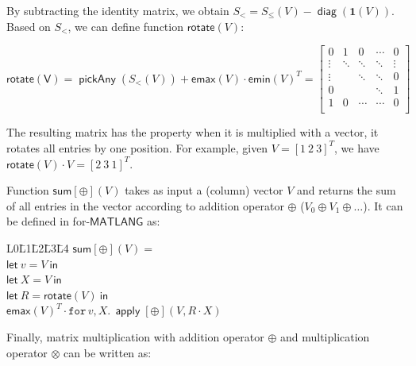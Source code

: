 \documentclass{article}
\DeclareMathOperator{\pickAny}{\mathsf{pickAny}}
\newcommand{\ML}{\mathsf{MATLANG}}
\newcommand{\transp}[1]{#1^T}
\newcommand{\SyntaxStyle}{\mathsf}
\newcommand{\rowdom}{\mathbf{1}}
\DeclareMathOperator{\diag}{\mathsf{diag}}
\DeclareMathOperator{\Apply}{\mathsf{apply}}
\newcommand{\one}{\rowdom}
\begin{document}
By subtracting the identity matrix, we obtain $S_{<} = S_{\leq}(V) - \diag(\one(V))$.
Based on $S_{<}$, we can define function $\mathsf{rotate}(V)$:

\[
    \mathsf{rotate(V)} = \pickAny(S_{<}(V)) + \mathsf{emax}(V) \cdot \transp{\mathsf{emin}(V)} =
    \begin{bmatrix}
        0      & 1      & 0      & \cdots & 0      \\
        \vdots & \ddots & \ddots & \ddots & \vdots \\
        \vdots &        & \ddots & \ddots & 0      \\
        0      &        &        & \ddots & 1      \\
        1      & 0      & \cdots & \cdots & 0      \\
    \end{bmatrix}
\]

The resulting matrix has the property when it is multiplied with a vector, it rotates all entries by one position.
For example, given $V = \transp{[1\ 2\ 3]}$, we have $\mathsf{rotate}(V) \cdot V = \transp{[2\ 3\ 1]}$.

Function $\mathsf{sum}[\oplus](V)$ takes as input a (column) vector $V$ and returns the sum of all entries in the vector according to addition operator $\oplus$ ($V_0 \oplus V_1 \oplus \ldots$).
It can be defined in for-$\ML$ as:

\begin{tabbing}
    L0\=L1\=L2\=L3\=L4 \kill
    $\mathsf{sum}[\oplus](V) = $\\
    $\SyntaxStyle{let}\ v = V \ \SyntaxStyle{in}$ \\
    $\SyntaxStyle{let}\ X = V \ \SyntaxStyle{in}$ \\
    $\SyntaxStyle{let}\ R = \mathsf{rotate}(V) \ \SyntaxStyle{in}$ \\
    $\transp{\mathsf{emax}(V)} \cdot \texttt{for}\, v,X \texttt{.}\, \Apply[\oplus](V, R \cdot X)$
\end{tabbing}

Finally, matrix multiplication with addition operator $\oplus$ and multiplication operator $\otimes$ can be written as:
\end{document}
